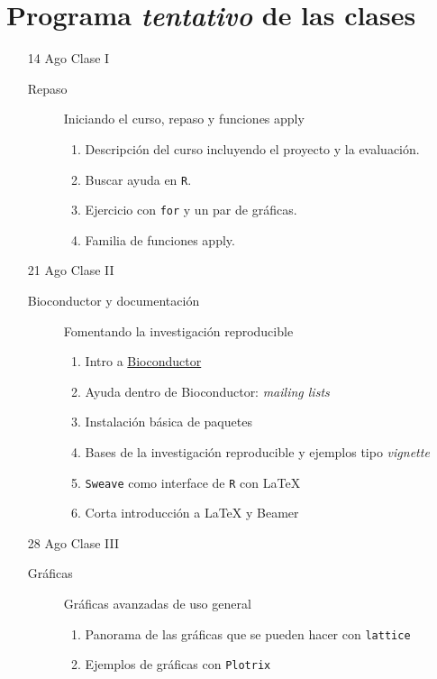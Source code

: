\documentclass[letterpaper,12pt]{article}
\newcommand{\pl}[1]{\texttt{#1}}
\newcommand{\myurlshort}[2]{\href{http://#1}{{\textsf{#2}}}}
\begin{document}
\section{Programa \emph{tentativo} de las clases}

\begin{itemize} 

\item[14 Ago] Clase I
  \begin{description}
  \item[Repaso] Iniciando el curso, repaso y funciones apply
  \begin{enumerate}
  \item Descripción del curso incluyendo el proyecto y la evaluación.
  \item Buscar ayuda en \pl{R}.
  \item Ejercicio con \pl{for} y un par de gráficas.
  \item Familia de funciones apply.
  \end{enumerate}
  \end{description}
  
  \item[21 Ago] Clase II
  \begin{description}
  \item[Bioconductor y documentación] Fomentando la investigación reproducible
  \begin{enumerate}
  \item Intro a \myurlshort{bioconductor.org}{Bioconductor}
  \item Ayuda dentro de Bioconductor: \emph{mailing lists}
  \item Instalación básica de paquetes
  \item Bases de la investigación reproducible y ejemplos tipo \emph{vignette}
  \item \pl{Sweave} como interface de \pl{R} con \LaTeX{}
  \item Corta introducción a \LaTeX{} y Beamer
  \end{enumerate}
  \end{description}
  
  \item[28 Ago] Clase III
  \begin{description}
  \item[Gráficas] Gráficas avanzadas de uso general
  \begin{enumerate}
  \item Panorama de las gráficas que se pueden hacer con \pl{lattice}
  \item Ejemplos de gráficas con \pl{Plotrix}
  \end{enumerate}
  \end{description}
  

\end{itemize}
\end{document}
